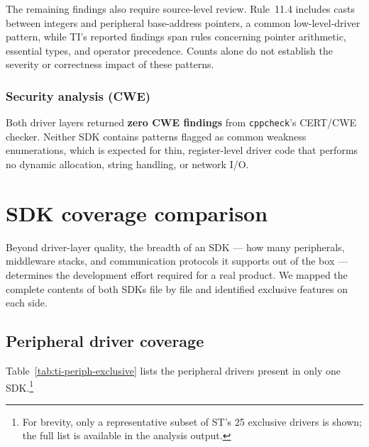 The remaining findings also require source-level review. Rule~11.4 includes casts between
integers and peripheral base-address pointers, a common low-level-driver pattern, while TI's
reported findings span rules concerning pointer arithmetic, essential types, and operator
precedence. Counts alone do not establish the severity or correctness impact of these
patterns.

\subsubsection*{Security analysis (CWE)}
Both driver layers returned \textbf{zero CWE findings} from \texttt{cppcheck}'s CERT/CWE
checker. Neither SDK contains patterns flagged as common weakness enumerations, which is
expected for thin, register-level driver code that performs no dynamic allocation, string
handling, or network I/O.

\section{SDK coverage comparison}
\label{sec:ti-sdk-coverage}

Beyond driver-layer quality, the breadth of an SDK --- how many peripherals, middleware
stacks, and communication protocols it supports out of the box --- determines the
development effort required for a real product. We mapped the complete contents of both
SDKs file by file and identified exclusive features on each side.

\subsection{Peripheral driver coverage}
\label{subsec:ti-periph-gaps}

Table~\ref{tab:ti-periph-exclusive} lists the peripheral drivers present in only one
SDK.\footnote{For brevity, only a representative subset of ST's 25 exclusive drivers is
shown; the full list is available in the analysis output.}

